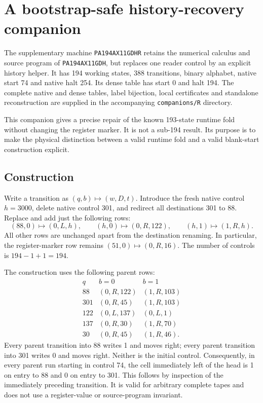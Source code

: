 \section{A bootstrap-safe history-recovery companion}
\label{sec:history-recovery}

The supplementary machine \texttt{PA194AX11GDHR} retains the numerical
calculus and source program of \texttt{PA194AX11GDH}, but replaces one
reader control by an explicit history helper. It has 194 working states,
388 transitions, binary alphabet, native start 74 and native halt 254.
Its dense table has start 0 and halt 194. The complete native and dense
tables, label bijection, local certificates and standalone reconstruction
are supplied in the accompanying \texttt{companions/R} directory.

This companion gives a precise repair of the known 193-state runtime
fold without changing the register marker. It is not a sub-194 result.
Its purpose is to make the physical distinction between a valid runtime
fold and a valid blank-start construction explicit.

\subsection{Construction}

Write a transition as $(q,b)\mapsto(w,D,t)$. Introduce the fresh native
control $h=3000$, delete native control 301, and redirect all destinations
301 to 88. Replace and add just the following rows:
\[
 (88,0)\mapsto(0,L,h),\qquad
 (h,0)\mapsto(0,R,122),\qquad
 (h,1)\mapsto(1,R,h).
\]
All other rows are unchanged apart from the destination renaming.
In particular, the register-marker row remains
$(51,0)\mapsto(0,R,16)$. The number of controls is
$194-1+1=194$.

The construction uses the following parent rows:
\[
\begin{array}{c|cc}
q & b=0 & b=1\\ \hline
88 &(0,R,122)&(1,R,103)\\
301&(0,R,45)&(1,R,103)\\
122&(0,L,137)&(0,L,1)\\
137&(0,R,30)&(1,R,70)\\
30 &(0,R,45)&(1,R,46).
\end{array}
\]
Every parent transition into 88 writes 1 and moves right; every parent
transition into 301 writes 0 and moves right. Neither is the initial
control. Consequently, in every parent run starting in control 74, the
cell immediately left of the head is 1 on entry to 88 and 0 on entry to
301. This follows by inspection of the immediately preceding transition.
It is valid for arbitrary complete tapes and does not use a register-value
or source-program invariant.


